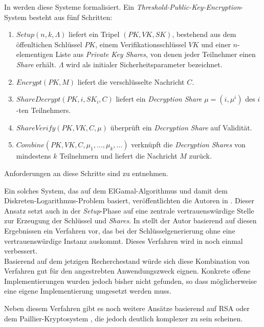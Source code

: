 \documentclass[
    fontsize=12pt,
    headings=small,
    parskip=half,           %
    bibliography=totoc,
    numbers=noenddot,       %
    open=any,               %
    ]{scrreprt}
\begin{document}
In \cite{boneh2006} werden diese Systeme formalisiert. Ein \textit{Threshold-Public-Key-Encryption}-System besteht aus fünf Schritten:
\begin{enumerate}
	\item \(Setup(n,k,\Lambda)\) liefert ein Tripel \((PK, VK, SK)\), bestehend aus dem öffenltichen Schlüssel \(PK\), einem Verifikationsschlüssel \(VK\) und einer \(n\)-elementigen Liste aus \textit{Private Key Shares}, von denen jeder Teilnehmer einen \textit{Share} erhält. \(\Lambda\) wird als initialer Sicherheitsparameter bezeichnet.
	\item \(Encrypt(PK, M)\) liefert die verschlüsselte Nachricht \(C\).
	\item \(ShareDecrypt(PK, i, SK_i, C)\) liefert ein \textit{Decryption Share} \(\mu=(i, \mu^i)\) des \(i\)-ten Teilnehmers.
	\item \(ShareVerify(PK, VK, C, \mu)\) überprüft ein \textit{Decryption Share} auf Validität.
	\item \(Combine(PK, VK, C, {\mu_1, \dots,\mu_k, \dots})\) verknüpft die \textit{Decryption Shares} von mindestens \(k\) Teilnehmern und liefert die Nachricht \(M\) zurück.
\end{enumerate}
Anforderungen an diese Schritte sind \cite{boneh2006} zu entnehmen. 

Ein solches System, das auf dem ElGamal-Algorithmus und damit dem Diskreten-Logarithmus-Problem basiert, veröffentlichten die Autoren in \cite{DesmedtFrankel1990}.  Dieser Ansatz setzt auch in der \textit{Setup}-Phase auf eine zentrale vertrauenswürdige Stelle zur Erzeugung der Schlüssel und \textit{Shares}. In \cite{pedersen1991} stellt der Autor basierend auf diesen Ergebnissen ein Verfahren vor, das bei der Schlüsselgenerierung ohne eine vertrauenswürdige Instanz auskommt. Dieses Verfahren wird in \cite{gennaro1999} noch einmal verbessert.\\
Basierend auf dem jetzigen Recherchestand würde sich diese Kombination von Verfahren gut für den angestrebten Anwendungszweck eignen. Konkrete offene Implementierungen wurden jedoch bisher nicht gefunden, so dass möglicherweise eine eigene Implementierung umgesetzt werden muss.

Neben diesem Verfahren gibt es noch weitere Ansätze basierend auf RSA \cite{desmedt1993, nguyen2005} oder dem Paillier-Kryptosystem \cite{paillier1999, damgard2001}, die jedoch deutlich komplexer zu sein scheinen. 



\begin{raggedright}         %
  \printbibliography        %
  \label{sec:literaturverzeichnis}
\end{raggedright}
\end{document}
